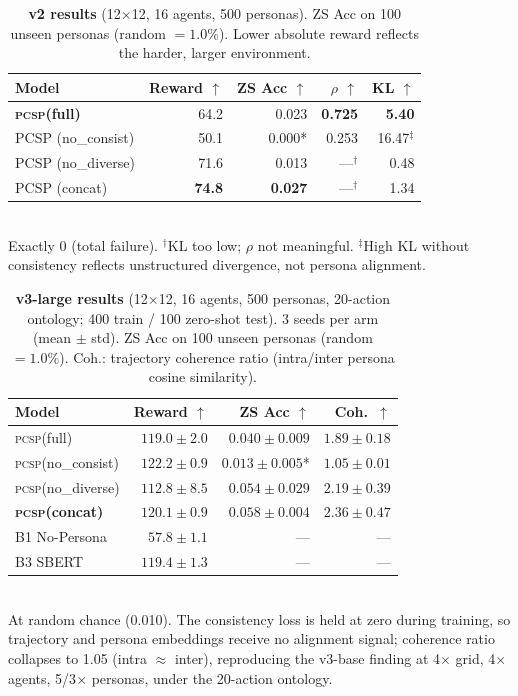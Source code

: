 \documentclass[conference]{IEEEtran}
\newcommand{\PCSP}{\textsc{pcsp}\xspace}
\begin{document}
\begin{table}[!t]
  \centering
  \small
  \caption{%
    \textbf{v2 results} (12$\times$12, 16 agents, 500 personas).
    ZS Acc on 100 unseen personas (random $=\!1.0\%$).
    Lower absolute reward reflects the harder, larger environment.}
  \label{tab:results_v2}
  \setlength{\tabcolsep}{3pt}
  \begin{tabular}{lrrrr}
    \toprule
    Model & Reward $\uparrow$ & ZS Acc $\uparrow$ & $\rho$ $\uparrow$ & KL $\uparrow$ \\
    \midrule
    \textbf{\PCSP (full)}  & 64.2 & 0.023 & \textbf{0.725} & \textbf{5.40} \\
    PCSP (no\_consist)     & 50.1 & 0.000*  & 0.253 & 16.47$^\ddagger$ \\
    PCSP (no\_diverse)     & 71.6 & 0.013   & ---$^\dagger$ & 0.48 \\
    PCSP (concat)          & \textbf{74.8} & \textbf{0.027} & ---$^\dagger$ & 1.34 \\
    \bottomrule
  \end{tabular}\\[2pt]
  {\footnotesize * Exactly 0 (total failure). $^\dagger$KL too low; $\rho$ not meaningful.
    $^\ddagger$High KL without consistency reflects unstructured divergence, not persona alignment.}
\end{table}

\begin{table}[!t]
  \centering
  \small
  \caption{%
    \textbf{v3-large results} (12$\times$12, 16 agents, 500 personas,
    20-action ontology; 400 train / 100 zero-shot test). 3 seeds per arm
    (mean $\pm$ std).
    ZS Acc on 100 unseen personas (random $=\!1.0\%$).
    Coh.: trajectory coherence ratio (intra/inter persona cosine similarity).}
  \label{tab:results_v3_large}
  \setlength{\tabcolsep}{3pt}
  \begin{tabular}{lrrr}
    \toprule
    Model & Reward $\uparrow$ & ZS Acc $\uparrow$ & Coh.\ $\uparrow$ \\
    \midrule
    \PCSP (full)         & $119.0\pm2.0$  & $0.040\pm0.009$  & $1.89\pm0.18$ \\
    \PCSP (no\_consist)  & $122.2\pm0.9$  & $0.013\pm0.005$*  & $1.05\pm0.01$ \\
    \PCSP (no\_diverse)  & $112.8\pm8.5$  & $0.054\pm0.029$  & $2.19\pm0.39$ \\
    \textbf{\PCSP (concat)} & $120.1\pm0.9$ & \textbf{$0.058\pm0.004$} & \textbf{$2.36\pm0.47$} \\
    B1 No-Persona        & $57.8\pm1.1$   & ---              & --- \\
    B3 SBERT             & $119.4\pm1.3$  & ---              & --- \\
    \bottomrule
  \end{tabular}\\[2pt]
  {\footnotesize * At random chance (0.010). The consistency loss is held at
   zero during training, so trajectory and persona embeddings receive no
   alignment signal; coherence ratio collapses to 1.05 (intra $\approx$
   inter), reproducing the v3-base finding at 4$\times$ grid, 4$\times$
   agents, 5/3$\times$ personas, under the 20-action ontology.}
\end{table}
\end{document}
